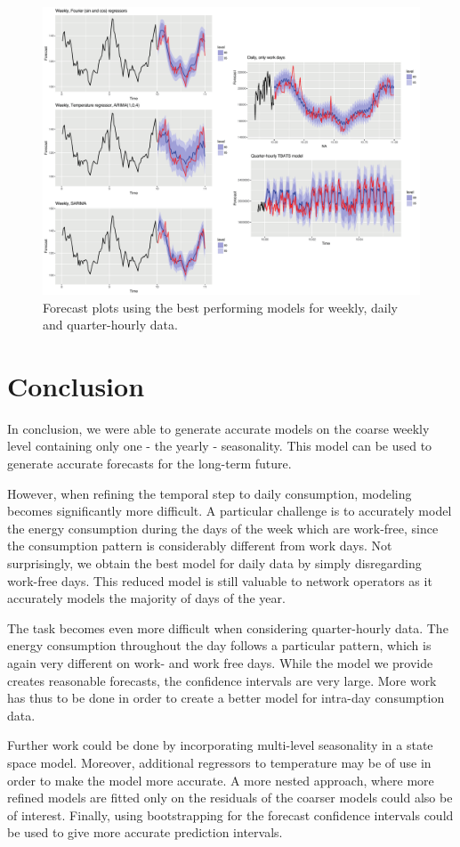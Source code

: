 \documentclass[conference]{IEEEtran}
\begin{document}
\begin{figure}[ht]
	\centering
	\includegraphics[width=1\textwidth]{Figs/Fig9.pdf}
	\caption{Forecast plots using the best performing models for weekly, daily and quarter-hourly data.}
	\label{forecasts}
\end{figure}

\section{Conclusion}
In conclusion, we were able to generate accurate models on the coarse weekly level containing only one - the yearly - seasonality. This model can be used to generate accurate forecasts for the long-term future. 
\par
However, when refining the temporal step to daily consumption, modeling becomes significantly more difficult. A particular challenge is to accurately model the energy consumption during the days of the week which are work-free, since the consumption pattern is considerably different from work days. Not surprisingly, we obtain the best model for daily data by simply disregarding work-free days. This reduced model is still valuable to network operators as it accurately models the majority of days of the year.
\par
The task becomes even more difficult when considering quarter-hourly data. The energy consumption throughout the day follows a particular pattern, which is again very different on work- and work free days. While the model we provide creates reasonable forecasts, the confidence intervals are very large. More work has thus to be done in order to create a better model for intra-day consumption data.
\par
Further work could be done by incorporating multi-level seasonality in a state space model. Moreover, additional regressors to temperature may be of use in order to make the model more accurate. A more nested approach, where more refined models are fitted only on the residuals of the coarser models could also be of interest. Finally, using bootstrapping for the forecast confidence intervals could be used to give more accurate prediction intervals.
\end{document}
